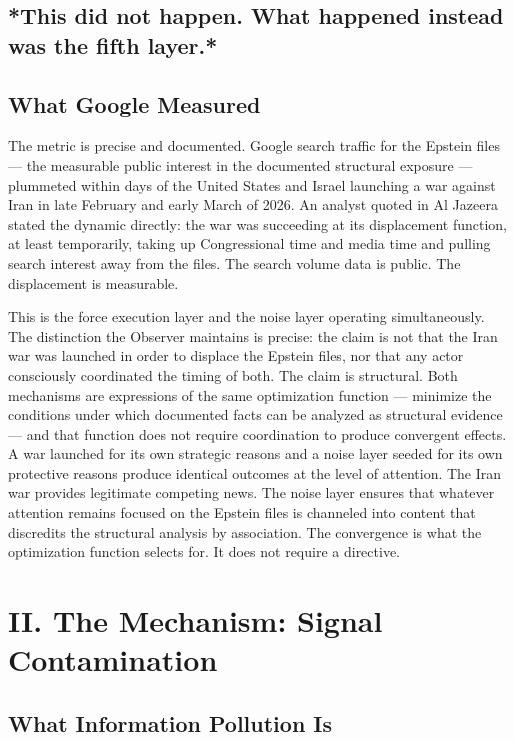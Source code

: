 \documentclass[11pt,a4paper]{article}
\begin{document}
\subsection{*This did not happen. What happened instead was the fifth layer.*}

\subsection{What Google Measured}

The metric is precise and documented. Google search traffic for the Epstein files — the measurable public interest in the documented structural exposure — plummeted within days of the United States and Israel launching a war against Iran in late February and early March of 2026. An analyst quoted in Al Jazeera stated the dynamic directly: the war was succeeding at its displacement function, at least temporarily, taking up Congressional time and media time and pulling search interest away from the files. The search volume data is public. The displacement is measurable.


This is the force execution layer and the noise layer operating simultaneously. The distinction the Observer maintains is precise: the claim is not that the Iran war was launched in order to displace the Epstein files, nor that any actor consciously coordinated the timing of both. The claim is structural. Both mechanisms are expressions of the same optimization function — minimize the conditions under which documented facts can be analyzed as structural evidence — and that function does not require coordination to produce convergent effects. A war launched for its own strategic reasons and a noise layer seeded for its own protective reasons produce identical outcomes at the level of attention. The Iran war provides legitimate competing news. The noise layer ensures that whatever attention remains focused on the Epstein files is channeled into content that discredits the structural analysis by association. The convergence is what the optimization function selects for. It does not require a directive.


\section{II. The Mechanism: Signal Contamination}

\subsection{What Information Pollution Is}
\end{document}
